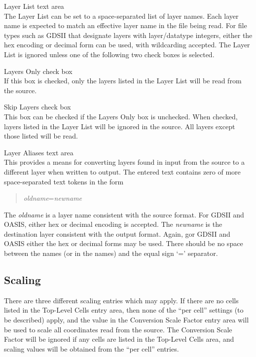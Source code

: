 \begin{description}
\item{{\cb Layer List} text area}\\
The {\cb Layer List} can be set to a space-separated list of layer
names.  Each layer name is expected to match an effective layer name
in the file being read.  For file types such as GDSII that designate
layers with layer/datatype integers, either the hex encoding or
decimal form can be used, with wildcarding accepted.  The {\cb Layer
List} is ignored unless one of the following two check boxes is
selected.

\item{{\cb Layers Only} check box}\\
If this box is checked, only the layers listed in the {\cb Layer
List} will be read from the source.

\item{{\cb Skip Layers} check box}\\
This box can be checked if the {\cb Layers Only} box is unchecked. 
When checked, layers listed in the {\cb Layer List} will be ignored in
the source.  All layers except those listed will be read.

\item{{\cb Layer Aliases} text area}\\
This provides a means for converting layers found in input from the
source to a different layer when written to output.  The entered text
contains zero of more space-separated text tokens in the form
\begin{quote}
{\it oldname\/}={\it newname}
\end{quote}
The {\it oldname} is a layer name consistent with the source format. 
For GDSII and OASIS, either hex or decimal encoding is accepted.  The
{\it newname} is the destination layer consistent with the output
format.  Again, gor GDSII and OASIS either the hex or decimal forms
may be used.  There should be no space between the names (or in the
names) and the equal sign `=' separator.
\end{description}

\subsection{Scaling}

There are three different scaling entries which may apply.  If there
are no cells listed in the {\cb Top-Level Cells} entry area, then none
of the ``per cell'' settings (to be described) apply, and the value in
the {\cb Conversion Scale Factor} entry area will be used to scale all
coordinates read from the source.  The {\cb Conversion Scale Factor}
will be ignored if any cells are listed in the {\cb Top-Level Cells}
area, and scaling values will be obtained from the ``per cell''
entries.

